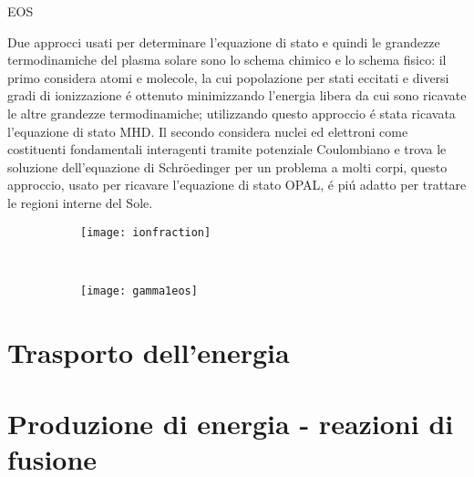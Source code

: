 \begin{frame}{EOS}


Due approcci usati per determinare l'equazione di stato e quindi le grandezze termodinamiche del plasma solare sono lo schema chimico e lo schema fisico: il primo considera atomi e molecole, la cui popolazione per stati eccitati e diversi gradi di ionizzazione \'e ottenuto minimizzando l'energia libera da cui sono ricavate le altre grandezze termodinamiche; utilizzando questo approccio \'e stata ricavata l'equazione di stato MHD. Il secondo considera nuclei ed elettroni come costituenti fondamentali interagenti tramite potenziale Coulombiano e trova le soluzione dell'equazione di Schr\"oedinger per un problema a molti corpi, questo approccio, usato per ricavare l'equazione di stato OPAL, \'e pi\'u adatto per trattare le regioni interne del Sole.


\begin{figure}[!ht]
\begin{subfigure}[b]{0.5\textwidth}
        \texttt{[image: ionfraction]}\label{ionfraction}
\end{subfigure}%
~
\begin{subfigure}[b]{0.5\textwidth}
        \texttt{[image: gamma1eos]}\label{fig:gamma1eos}
\end{subfigure}
\end{figure}


\end{frame}


\section{Trasporto dell'energia}

\section{Produzione di energia - reazioni di fusione}

